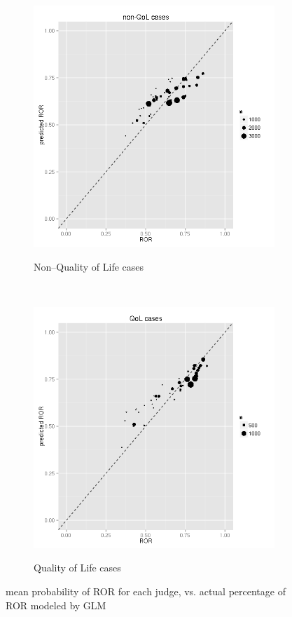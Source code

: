 \begin{figure}
  \begin{subfigure}{0.49\textwidth}
    \caption{Non--Quality of Life cases}
    \includegraphics[width=\textwidth]{figures/glmplots/ror_scatter.png}
    \label{fig:mean_ROR_non--QoL_GLM}
  \end{subfigure}
  ~
  \begin{subfigure}{0.49\textwidth}
    \caption{Quality of Life cases}
    \includegraphics[width=\textwidth]{figures/glmplots/rorq_scatter.png}
    \label{fig:mean_ROR_QoL_GLM}
  \end{subfigure}
  \caption{mean probability of ROR for each judge, vs.
  actual percentage of ROR modeled by GLM}
\end{figure}


